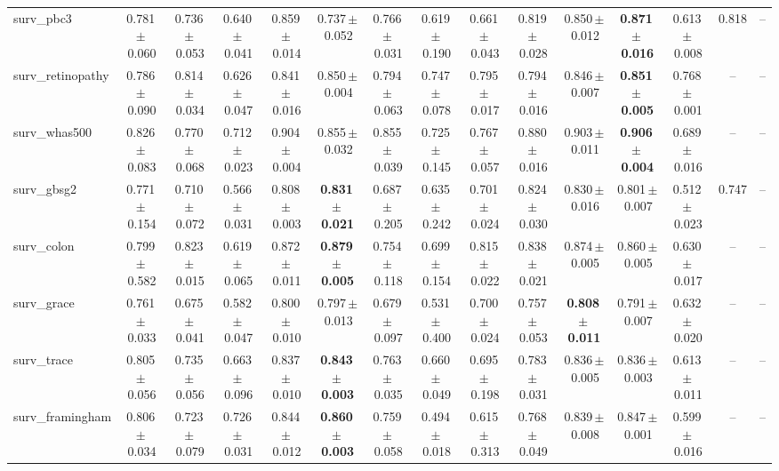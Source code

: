 \documentclass[8pt]{extarticle}
\begin{document}
\begin{longtable}{l*{14}{c}}
surv\_pbc3 & 0.781\,$\pm$\,0.060 & 0.736\,$\pm$\,0.053 & 0.640\,$\pm$\,0.041 & 0.859\,$\pm$\,0.014 & 0.737\,$\pm$\,0.052 & 0.766\,$\pm$\,0.031 & 0.619\,$\pm$\,0.190 & 0.661\,$\pm$\,0.043 & 0.819\,$\pm$\,0.028 & 0.850\,$\pm$\,0.012 & \textbf{0.871\,$\pm$\,0.016} & 0.613\,$\pm$\,0.008 & 0.818 & -- \\
surv\_retinopathy & 0.786\,$\pm$\,0.090 & 0.814\,$\pm$\,0.034 & 0.626\,$\pm$\,0.047 & 0.841\,$\pm$\,0.016 & 0.850\,$\pm$\,0.004 & 0.794\,$\pm$\,0.063 & 0.747\,$\pm$\,0.078 & 0.795\,$\pm$\,0.017 & 0.794\,$\pm$\,0.016 & 0.846\,$\pm$\,0.007 & \textbf{0.851\,$\pm$\,0.005} & 0.768\,$\pm$\,0.001 & -- & -- \\
surv\_whas500 & 0.826\,$\pm$\,0.083 & 0.770\,$\pm$\,0.068 & 0.712\,$\pm$\,0.023 & 0.904\,$\pm$\,0.004 & 0.855\,$\pm$\,0.032 & 0.855\,$\pm$\,0.039 & 0.725\,$\pm$\,0.145 & 0.767\,$\pm$\,0.057 & 0.880\,$\pm$\,0.016 & 0.903\,$\pm$\,0.011 & \textbf{0.906\,$\pm$\,0.004} & 0.689\,$\pm$\,0.016 & -- & -- \\
surv\_gbsg2 & 0.771\,$\pm$\,0.154 & 0.710\,$\pm$\,0.072 & 0.566\,$\pm$\,0.031 & 0.808\,$\pm$\,0.003 & \textbf{0.831\,$\pm$\,0.021} & 0.687\,$\pm$\,0.205 & 0.635\,$\pm$\,0.242 & 0.701\,$\pm$\,0.024 & 0.824\,$\pm$\,0.030 & 0.830\,$\pm$\,0.016 & 0.801\,$\pm$\,0.007 & 0.512\,$\pm$\,0.023 & 0.747 & -- \\
surv\_colon & 0.799\,$\pm$\,0.582 & 0.823\,$\pm$\,0.015 & 0.619\,$\pm$\,0.065 & 0.872\,$\pm$\,0.011 & \textbf{0.879\,$\pm$\,0.005} & 0.754\,$\pm$\,0.118 & 0.699\,$\pm$\,0.154 & 0.815\,$\pm$\,0.022 & 0.838\,$\pm$\,0.021 & 0.874\,$\pm$\,0.005 & 0.860\,$\pm$\,0.005 & 0.630\,$\pm$\,0.017 & -- & -- \\
surv\_grace & 0.761\,$\pm$\,0.033 & 0.675\,$\pm$\,0.041 & 0.582\,$\pm$\,0.047 & 0.800\,$\pm$\,0.010 & 0.797\,$\pm$\,0.013 & 0.679\,$\pm$\,0.097 & 0.531\,$\pm$\,0.400 & 0.700\,$\pm$\,0.024 & 0.757\,$\pm$\,0.053 & \textbf{0.808\,$\pm$\,0.011} & 0.791\,$\pm$\,0.007 & 0.632\,$\pm$\,0.020 & -- & -- \\
surv\_trace & 0.805\,$\pm$\,0.056 & 0.735\,$\pm$\,0.056 & 0.663\,$\pm$\,0.096 & 0.837\,$\pm$\,0.010 & \textbf{0.843\,$\pm$\,0.003} & 0.763\,$\pm$\,0.035 & 0.660\,$\pm$\,0.049 & 0.695\,$\pm$\,0.198 & 0.783\,$\pm$\,0.031 & 0.836\,$\pm$\,0.005 & 0.836\,$\pm$\,0.003 & 0.613\,$\pm$\,0.011 & -- & -- \\
surv\_framingham & 0.806\,$\pm$\,0.034 & 0.723\,$\pm$\,0.079 & 0.726\,$\pm$\,0.031 & 0.844\,$\pm$\,0.012 & \textbf{0.860\,$\pm$\,0.003} & 0.759\,$\pm$\,0.058 & 0.494\,$\pm$\,0.018 & 0.615\,$\pm$\,0.313 & 0.768\,$\pm$\,0.049 & 0.839\,$\pm$\,0.008 & 0.847\,$\pm$\,0.001 & 0.599\,$\pm$\,0.016 & -- & -- \\

\end{longtable}
\end{document}
